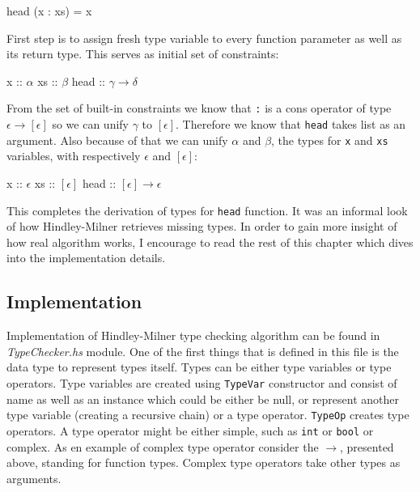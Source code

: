 \documentclass[12pt,a4paper]{report}
\begin{document}
\vspace*{0.2in}
\begin{code}[style=haskell]
head (x : xs) = x
\end{code}

First step is to assign fresh type variable to every function parameter as
well as its return type. This serves as initial set of constraints:

\vspace*{0.2in}
\begin{code}[mathescape=true,style=haskell]
  x :: $\alpha$
  xs :: $\beta$
  head :: $\gamma \rightarrow \delta$
\end{code}

From the set of built-in constraints we know that \texttt{:} is a cons operator
of type $\epsilon \rightarrow [\epsilon]$ so we can unify $\gamma$ to
$[\epsilon]$. Therefore we know that \texttt{head} takes list as an argument.
Also because of that we can unify $\alpha$ and $\beta$, the types for
\texttt{x} and \texttt{xs} variables, with respectively $\epsilon$ and
$[\epsilon]$:

\vspace*{0.2in}
\begin{code}[mathescape=true,style=haskell]
  x :: $\epsilon$
  xs :: $[\epsilon]$
  head :: $[\epsilon] \rightarrow \epsilon$
\end{code}

This completes the derivation of types for \texttt{head} function. It was an
informal look of how Hindley-Milner retrieves missing types. In order to gain
more insight of how real algorithm works, I encourage to read the rest of this
chapter which dives into the implementation details.

\subsection{Implementation}
Implementation of Hindley-Milner type checking algorithm can be found in
\textit{TypeChecker.hs} module. One of the first things that is defined in this
file is the data type to represent types itself. Types can be either type
variables or type operators. Type variables are created using \texttt{TypeVar}
constructor and consist of name as well as an instance which could be either be
null, or represent another type variable (creating a recursive chain) or a type
operator. \texttt{TypeOp} creates type operators. A type operator might
be either simple, such as \texttt{int} or \texttt{bool} or complex. As en
example of complex type operator consider the $\rightarrow$, presented
above, standing for function types. Complex type operators take other types as
arguments.
\end{document}

